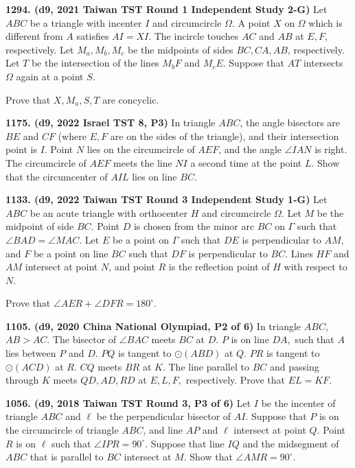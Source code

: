 \documentclass{article}
\begin{document}
\textbf{1294. (\color{red}d9\color{black}, 2021 Taiwan TST Round 1 Independent Study 2-G)} Let $ABC$ be a triangle with incenter $I$ and circumcircle $\Omega$. A point $X$ on $\Omega$ which is different from $A$ satisfies $AI=XI$. The incircle touches $AC$ and $AB$ at $E, F$, respectively. Let $M_a, M_b, M_c$ be the midpoints of sides $BC, CA, AB$, respectively. Let $T$ be the intersection of the lines $M_bF$ and $M_cE$. Suppose that $AT$ intersects $\Omega$ again at a point $S$.

Prove that $X, M_a, S, T$ are concyclic.

\textbf{1175. (\color{red}d9\color{black}, 2022 Israel TST 8, P3)} In triangle $ABC$, the angle bisectors are $BE$ and $CF$ (where $E, F$ are on the sides of the triangle), and their intersection point is $I$. Point $N$ lies on the circumcircle of $AEF$, and the angle $\angle IAN$ is right. The circumcircle of $AEF$ meets the line $NI$ a second time at the point $L$. Show that the circumcenter of $AIL$ lies on line $BC$.

\textbf{1133. (\color{red}d9\color{black}, 2022 Taiwan TST Round 3 Independent Study 1-G)} Let $ABC$ be an acute triangle with orthocenter $H$ and circumcircle $\Omega$. Let $M$ be the midpoint of side $BC$. Point $D$ is chosen from the minor arc $BC$ on $\Gamma$ such that $\angle BAD = \angle MAC$. Let $E$ be a point on $\Gamma$ such that $DE$ is perpendicular to $AM$, and $F$ be a point on line $BC$ such that $DF$ is perpendicular to $BC$. Lines $HF$ and $AM$ intersect at point $N$, and point $R$ is the reflection point of $H$ with respect to $N$.

Prove that $\angle AER + \angle DFR = 180^\circ$.

\textbf{1105. (\color{red}d9\color{black}, 2020 China National Olympiad, P2 of 6)} In triangle $ABC$, $AB>AC.$ The bisector of $\angle BAC$ meets $BC$ at $D.$ $P$ is on line $DA,$ such that $A$ lies between $P$ and $D$. $PQ$ is tangent to $\odot(ABD)$ at $Q.$ $PR$ is tangent to $\odot(ACD)$ at $R.$ $CQ$ meets $BR$ at $K.$ The line parallel to $BC$ and passing through $K$ meets $QD,AD,RD$ at $E,L,F,$ respectively. Prove that $EL=KF.$

\textbf{1056. (\color{red}d9\color{black}, 2018 Taiwan TST Round 3, P3 of 6)} Let $I$ be the incenter of triangle $ABC$ and $\ell$ be the perpendicular bisector of $AI$. Suppose that $P$ is on the circumcircle of triangle $ABC$, and line $AP$ and $\ell$ intersect at point $Q$. Point $R$ is on $\ell$ such that $\angle IPR = 90^{\circ}$. Suppose that line $IQ$ and the midsegment of $ABC$ that is parallel to $BC$ intersect at $M$. Show that $\angle AMR = 90^{\circ}$.\\[6pt]
\end{document}
